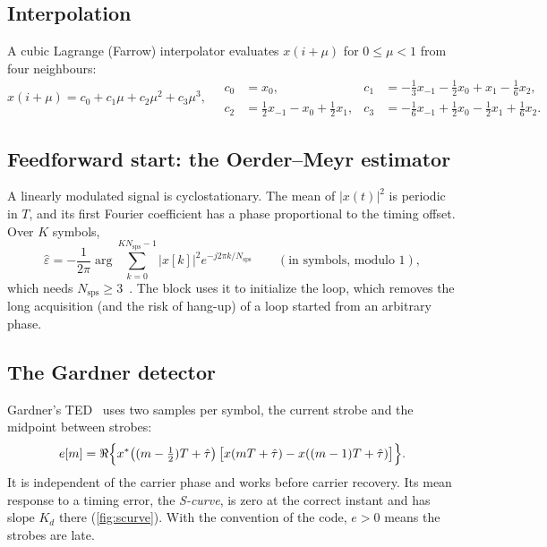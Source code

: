 \subsection{Interpolation}
A cubic Lagrange (Farrow) interpolator evaluates $x(i+\mu)$ for $0\le\mu<1$ from four
neighbours:
\begin{equation}
  x(i+\mu)=c_0+c_1\mu+c_2\mu^2+c_3\mu^3,\quad
  \begin{aligned}
  c_0&=x_0, & c_1&=-\tfrac13x_{-1}-\tfrac12x_0+x_1-\tfrac16x_2,\\
  c_2&=\tfrac12x_{-1}-x_0+\tfrac12x_1, & c_3&=-\tfrac16x_{-1}+\tfrac12x_0-\tfrac12x_1+\tfrac16x_2 .
  \end{aligned}
\end{equation}

\subsection{Feedforward start: the Oerder--Meyr estimator}
A linearly modulated signal is cyclostationary. The mean of $|x(t)|^2$ is periodic in $T$, and
its first Fourier coefficient has a phase proportional to the timing offset. Over $K$ symbols,
\begin{equation}
  \hat\varepsilon=-\frac{1}{2\pi}\arg\sum_{k=0}^{KN_{\mathrm{sps}}-1}|x[k]|^2e^{-j2\pi k/N_{\mathrm{sps}}}
  \qquad(\text{in symbols, modulo }1),
\end{equation}
which needs $N_{\mathrm{sps}}\ge3$~\cite{oerder1988}. The block uses it to initialize the
loop, which removes the long acquisition (and the risk of hang-up) of a loop started from an
arbitrary phase.

\subsection{The Gardner detector}
Gardner's TED~\cite{gardner1986} uses two samples per symbol, the current strobe and the
midpoint between strobes:
\begin{equation}
  e[m]=\Re\Big\{x^{*}\big((m-\tfrac12)T+\hat\tau\big)\,\big[x(mT+\hat\tau)-x((m-1)T+\hat\tau)\big]\Big\}.
\end{equation}
It is independent of the carrier phase and works before carrier recovery. Its mean response
to a timing error, the \emph{S-curve}, is zero at the correct instant and has slope $K_d$
there (\cref{fig:scurve}). With the convention of the code, $e>0$ means the strobes are late.

